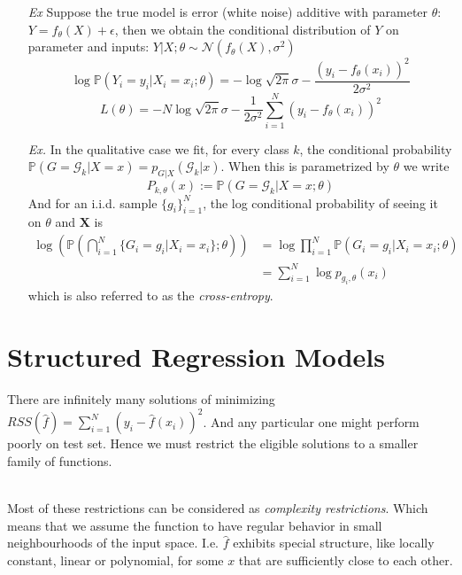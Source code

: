\documentclass[a4paper, 11pt]{article}
\begin{document}
\begin{itemize}
	\item[\textit{Ex}] Suppose the true model is error (white noise) additive with parameter $\theta$: $Y=f_{\theta}(X)+\epsilon$, then we obtain the conditional distribution of $Y$ on parameter and inputs: $Y|X; \theta \sim \mathcal{N}(f_{\theta}(X), \sigma^2)$
	$$
	\log\mathbb{P}\left(Y_i=y_i|X_i=x_i;\theta\right) = -\log\sqrt{2\pi} \sigma - \frac{(y_i - f_\theta(x_i))^2}{2\sigma^2}
	$$
	$$
	L(\theta) = -N\log\sqrt{2\pi} \sigma  - \frac{1}{2\sigma^2}\sum_{i=1}^N(y_i - f_\theta(x_i))^2
	$$

	\item[\textit{Ex.}] In the qualitative case we fit, for every class $k$, the conditional probability $\mathbb{P}\left(G=\mathcal{G}_k|X=x\right) = p_{G|X}(\mathcal{G}_k|x)$. When this is parametrized by $\theta$ we write
	$$
	P_{k,\theta}(x) := \mathbb{P}\left(G=\mathcal{G}_k|X=x; \theta\right)
	$$
	And for an i.i.d. sample $\{g_i\}_{i=1}^N$, the log conditional probability of seeing it on $\theta$ and $\bm{X}$ is
	\begin{equation}
		\begin{split}
			\log \left(\mathbb{P}\left(\bigcap_{i=1}^{N}\{G_i = g_i|X_i=x_i\}; \theta\right)\right) &= \log \prod_{i=1}^N \mathbb{P}\left(G_i=g_i|X_i=x_i;\theta\right) \\
			&= \sum_{i=1}^N \log p_{g_i, \theta}(x_i)
		\end{split}
	\end{equation}
	which is also referred to as the \emph{cross-entropy}.
\end{itemize}




\section{Structured Regression Models}
There are infinitely many solutions of minimizing $RSS(\hat{f})=\sum_{i=1}^N (y_i-\hat{f}(x_i))^2$. And any particular one might perform poorly on test set. Hence we must restrict the eligible solutions to a smaller family of functions.

~\\
Most of these restrictions can be considered as \emph{complexity restrictions}. Which means that we assume the function to have regular behavior in small neighbourhoods of the input space. I.e. $\hat{f}$ exhibits special structure, like locally constant, linear or polynomial, for some $x$ that are sufficiently close to each other. 
\end{document}

